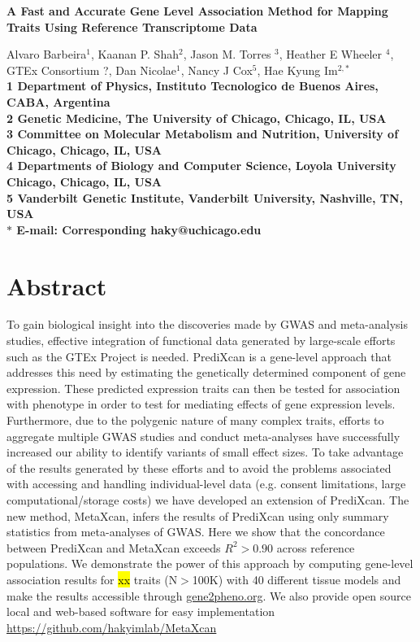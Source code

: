 \documentclass[10pt]{article}
\date{}
\begin{document}
\begin{flushleft}
{\Large
\textbf{A Fast and Accurate Gene Level Association Method for Mapping Traits Using Reference Transcriptome Data}

}

Alvaro Barbeira$^{1}$, 
Kaanan P. Shah$^{2}$, 
Jason M. Torres $^3$,
Heather E Wheeler $^4$,
GTEx Consortium ?,
Dan Nicolae$^{1}$,
Nancy J Cox$^{5}$,
Hae Kyung Im$^{2,\ast}$
\\
\bf{1} Department of Physics, Instituto Tecnologico de Buenos Aires, CABA, Argentina 
\\
\bf{2} Genetic Medicine, The University of Chicago, Chicago, IL, USA
\\
\bf{3} Committee on Molecular Metabolism and Nutrition, University of Chicago, Chicago, IL, USA
\\
\bf{4} Departments of Biology and Computer Science, Loyola University Chicago, Chicago, IL, USA
\\
\bf{5} Vanderbilt Genetic Institute, Vanderbilt University, Nashville, TN, USA
\\
$\ast$ E-mail: Corresponding haky@uchicago.edu
\end{flushleft}

\section*{Abstract}

To gain biological insight into the discoveries made by GWAS and meta-analysis studies, effective integration of functional data generated by large-scale efforts such as the GTEx Project is needed. PrediXcan is a gene-level approach that addresses this need by estimating the genetically determined component of gene expression. These predicted expression traits can then be tested for association with phenotype in order to test for mediating effects of gene expression levels. Furthermore, due to the polygenic nature of many complex traits, efforts to aggregate multiple GWAS studies and conduct meta-analyses have successfully increased our ability to identify variants of small effect sizes. To take advantage of the results generated by these efforts and to avoid the problems associated with accessing and handling individual-level data (e.g. consent limitations, large computational/storage costs) we have developed an extension of PrediXcan. The new method, MetaXcan, infers the results of PrediXcan using only summary statistics from meta-analyses of GWAS. Here we show that the concordance between PrediXcan and MetaXcan exceeds $R^2 > 0.90$ across reference populations.
We demonstrate the power of this approach by computing gene-level association results for \hl{xx} traits (N$>$100K) with 40 different tissue models and make the results accessible through \url{gene2pheno.org}. We also provide open source local and web-based software for easy implementation \url{https://github.com/hakyimlab/MetaXcan}
\end{document}
